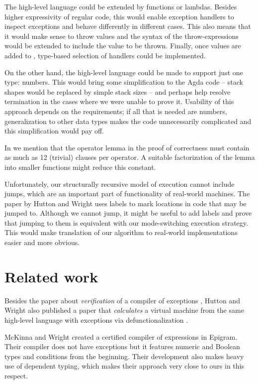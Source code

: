 The high-level language could be extended by functions or lambdas. Besides higher expressivity
of regular code, this would enable exception handlers to inspect exceptions and behave differently
in different cases. This also means that it would make sense to throw values and the syntax
of the throw-expressions would be extended to include the value to be thrown.
Finally, once values are added to , type-based selection of handlers could be
implemented.

On the other hand, the high-level language could be made to support just one type: numbers.
This would bring some simplification to the Agda code -- stack shapes would be replaced by
simple stack sizes -- and perhaps help resolve termination
in the cases where we were unable to prove it. Usability of this approach depends on the
requirements; if all that is needed are numbers, generalization to other data types makes
the code unnecessarily complicated and this simplification would pay off.

In  we mention that the operator lemma in the proof of correctness
must contain as much as 12 (trivial) clauses per operator. A suitable factorization of the
lemma into smaller functions might reduce this constant.

Unfortunately, our structurally recursive model of execution cannot include jumps, which are an
important part of functionality of real-world machines. The paper by Hutton and Wright
\cite{gmh:exceptions} uses labels to mark locations in code that may be jumped to. Although
we cannot jump, it might be useful to add labels and prove that jumping to them is
equivalent with our mode-switching execution strategy. This would make translation
of our algorithm to real-world implementations easier and more obvious.

\section{Related work}

Besides the paper about \emph{verification} of a compiler of exceptions
\cite{gmh:exceptions}, Hutton and Wright also published a paper that \emph{calculates}
a virtual machine from the same high-level language with exceptions via defunctionalization
\cite{gmh:exceptional-machine}.

McKinna and Wright created a certified compiler of expressions \cite{epigram-compiler} in Epigram.
Their compiler does not have exceptions but it features numeric and Boolean types and
conditions from the beginning. Their development also makes heavy use of dependent typing,
which makes their approach very close to ours in this respect.

